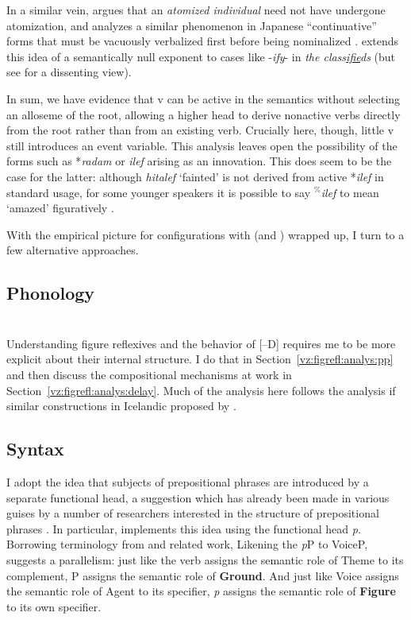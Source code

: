 In a similar vein, \cite{marantz13} argues that an \emph{atomized individual} need not have undergone atomization, and analyzes a similar phenomenon in Japanese ``continuative'' forms that must be vacuously verbalized first{ before being nominalized} \citep{volpe05}. \cite{anagnostopoulou14thli} extends this idea of a semantically null exponent to cases like -\emph{ify}- in \emph{the class\underline{ifie}ds} (but see \citealt{borer14lingua} for a dissenting view).

In sum, we have evidence that v can be active in the semantics without selecting an alloseme of the root, allowing a higher {\vz} head to derive nonactive verbs directly from the root rather than from an existing verb. Crucially here, though, little v still introduces an event variable. This analysis leaves open the possibility of the forms such as *\emph{radam} or \emph{ilef} arising as an innovation. This does seem to be the case for the latter: although \emph{hitalef} `fainted' is not derived from active *\emph{ilef} in standard usage, for some younger speakers it is possible to say $^{\%}$\emph{ilef} to mean `amazed' figuratively \citep{laks14}.

With the empirical picture for configurations with {\vz} (and {\pz}) wrapped up, I turn to a few alternative approaches.

	
	\subsection{Phonology} \label{vz:vz:phono}


\section{\pz} \label{vz:pz}
Understanding figure reflexives and the behavior of [--D] requires me to be more explicit about their internal structure. I do that in Section~\ref{vz:figrefl:analys:pp} and then discuss the compositional mechanisms at work in Section~\ref{vz:figrefl:analys:delay}. Much of the analysis here follows the analysis if similar constructions in Icelandic proposed by \cite{wood15springer}.


	\subsection{Syntax} \label{vz:pz:syn}
	
I adopt the idea that subjects of prepositional phrases are introduced by a separate functional head, a suggestion which has already been made in various guises by a number of researchers interested in the structure of prepositional phrases \citep{vanriemsdijk90,rooryck96,koopman97,gehrke08phd,dendikken03,dendikken10}. In particular, \cite{svenonius03,svenonius07,svenonius10} implements this idea using the functional head \emph{p}. Borrowing terminology from \cite{talmy78} and related work, Likening the \emph{p}P to VoiceP, \cite{wood14nllt,wood15springer} suggests a parallelism: just like the verb assigns the semantic role of Theme to its complement, P assigns the semantic role of \textbf{Ground}. And just like Voice assigns the semantic role of Agent to its specifier, \emph{p} assigns the semantic role of \textbf{Figure} to its own specifier.

